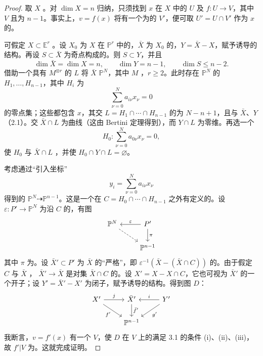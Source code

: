 \begin{proof}
取 $X$ 。对 $\dim X=n$ 归纳，只须找到 $x$ 在 $X$ 中的 $U$ 及 $f:U\to V$，其中 $V$ 且为 $n-1$。事实上，$v=f(x)$ 将有一个为的 $V'$，便可取 $U'=U\cap V'$ 作为 $x$ 的。

可假定 $X\subset\mathbb E^r$ 。设 $X_0$ 为 $X$ 在 $\mathbb P^r$ 中的，$\bar X$ 为 $X_0$ 的，$Y=\bar X-X$，赋予诱导的结构。再设 $S\subset\bar X$ 为奇点构成的。则 $S\subset Y$，并且
\[
 \dim\bar X=\dim X=n,\qquad\dim Y=n-1,\qquad\dim S\leq n-2.
\]
借助一个具有 $M^{\otimes r}$ 的 $L$ 将 $\bar X$  $\mathbb P^N$，其中 $M$ ，$r\geq2$。此时存在 $\mathbb P^N$ 的 $H_1,\ldots,H_{n-1}$，其中 $H_i$ 为
\[
 \sum_{\nu=0}^Na_{i\nu}x_\nu=0
\]
的零点集；这些都包含 $x$，其交 $L=H_1\cap\cdots\cap H_{n-1}$ 的为 $N-n+1$，且与 $\bar X$、$Y$ （2.1）。交 $\bar X\cap L$ 为曲线（这由 Bertini 定理得到），而 $Y\cap L$ 为零维。再选一个
\[
 H_0:\sum_{\nu=0}^Na_{0\nu}x_\nu=0,
\]
使 $H_0$ 与 $\bar X\cap L$ ，并使 $H_0\cap Y\cap L=\varnothing$。

考虑通过“引入坐标”
\[
 y_i=\sum_{\nu=0}^Na_{i\nu}x_\nu
\]
得到的 $\mathbb P^N\dashrightarrow\mathbb P^{n-1}$。这是一个在 $C=H_0\cap\cdots\cap H_{n-1}$ 之外有定义的。设 $\varepsilon:P'\to\mathbb P^N$ 为沿 $C$ 的，有图
\[
\begin{tikzcd}
\mathbb P^N\arrow[dr,dashed]&P'\arrow[l,"\varepsilon"']\arrow[d,"\pi"]\\
&\mathbb P^{n-1}
\end{tikzcd}
\]
其中 $\pi$ 为。设 $\bar X'\subset P'$ 为 $\bar X$ 的“严格”，即 $\varepsilon^{-1}(\bar X-(\bar X\cap C))$ 的。由于假定 $C$ 与 $\bar X$ ， $\bar X'\to\bar X$ 是对集 $\bar X\cap C$ 的。设 $X'=X-X\cap C$，它也可视为 $\bar X'$ 的一个开子；设 $Y'=\bar X'-X'$ 为闭子，赋予诱导的结构。得到图 $D$：
\[
\begin{tikzcd}
X'\arrow[r,"j"]\arrow[dr,"f'"']&\bar X'\arrow[d,"\bar f'"]&Y'\arrow[l,"i"']\arrow[dl,"g'"]\\
&\mathbb P^{n-1}&
\end{tikzcd}
\]
我断言，$v=f'(x)$ 有一个 $V$，使 $D$ 在 $V$ 上的满足 3.1 的条件 (i)、(ii)、(iii)，故 $f'|V$ 为。这就完成证明。


\end{proof}
